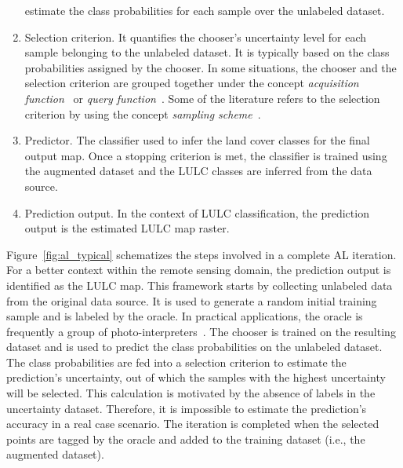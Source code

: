 \documentclass[parskip=full]{scrartcl}
\begin{document}
\begin{enumerate}
        estimate the class probabilities for each sample over the unlabeled
        dataset.
    \item Selection criterion. It quantifies the chooser's uncertainty level
        for each sample belonging to the unlabeled dataset. It is typically
        based on the class probabilities assigned by the chooser. In some
        situations, the chooser and the selection criterion are grouped
        together under the concept \textit{acquisition
        function}~\cite{Ruzicka2020} or \textit{query function}~\cite{Su2020}.
        Some of the literature refers to the selection criterion by using the
        concept \textit{sampling scheme}~\cite{Liu2020}.
    \item Predictor. The classifier used to infer the land cover classes for
        the final output map. Once a stopping criterion is met, the classifier
        is trained using the augmented dataset and the LULC classes are
        inferred from the data source.
    \item Prediction output. In the context of LULC classification, the
        prediction output is the estimated LULC map raster.
\end{enumerate}

Figure~\ref{fig:al_typical} schematizes the steps involved in a complete AL
iteration. For a better context within the remote sensing domain, the
prediction output is identified as the LULC map. This framework starts by
collecting unlabeled data from the original data source. It is used to generate
a random initial training sample and is labeled by the oracle. In practical
applications, the oracle is frequently a group of
photo-interpreters~\cite{Kottke2017}. The chooser is trained on the resulting
dataset and is used to predict the class probabilities on the unlabeled
dataset. The class probabilities are fed into a selection criterion to estimate
the prediction's uncertainty, out of which the samples with the highest
uncertainty will be selected. This calculation is motivated by the absence of
labels in the uncertainty dataset. Therefore, it is impossible to estimate the
prediction's accuracy in a real case scenario. The iteration is completed when
the selected points are tagged by the oracle and added to the training dataset
(i.e., the augmented dataset). 
\end{document}
